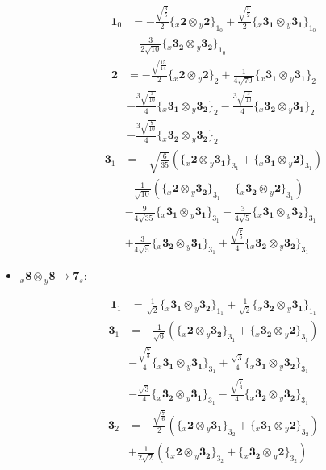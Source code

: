 \documentclass[english]{article}
\newcommand{\rep}[1]{\mathbf{#1}}
\newcommand{\repx}[2]{{}_{#2}\mathbf{#1}}
\newcommand{\tsprodx}[2]{\repx{#1}{x}\otimes\repx{#2}{y}}
\newcommand{\subcgs}[3]{\big\{ \tsprodx{#1}{#2}\big\}^{}_{#3}}
\begin{document}
\begin{itemize}
\begin{fleqn}
\begin{align*}
\rep{1}_{0} & = -\frac{\sqrt{\frac{3}{5}}}{2}\subcgs{2}{2}{1_{0}}+\frac{\sqrt{\frac{5}{2}}}{2}\subcgs{3_{1}}{3_{1}}{1_{0}} \\ 
 & -\frac{3}{2 \sqrt{10}}\subcgs{3_{2}}{3_{2}}{1_{0}}
\end{align*}
\begin{align*}
\rep{2} & = -\frac{\sqrt{\frac{15}{14}}}{2}\subcgs{2}{2}{2}+\frac{1}{4 \sqrt{70}}\subcgs{3_{1}}{3_{1}}{2} \\ 
 & -\frac{3 \sqrt{\frac{3}{10}}}{4}\subcgs{3_{1}}{3_{2}}{2}-\frac{3 \sqrt{\frac{3}{10}}}{4}\subcgs{3_{2}}{3_{1}}{2} \\ 
 & -\frac{3 \sqrt{\frac{7}{10}}}{4}\subcgs{3_{2}}{3_{2}}{2}
\end{align*}
\begin{align*}
\rep{3}_{1} & = -\sqrt{\frac{6}{35}}\left(\subcgs{2}{3_{1}}{3_{1}}+\subcgs{3_{1}}{2}{3_{1}}\right) \\ 
 & -\frac{1}{\sqrt{10}}\left(\subcgs{2}{3_{2}}{3_{1}}+\subcgs{3_{2}}{2}{3_{1}}\right) \\ 
 & -\frac{9}{4 \sqrt{35}}\subcgs{3_{1}}{3_{1}}{3_{1}}-\frac{3}{4 \sqrt{5}}\subcgs{3_{1}}{3_{2}}{3_{1}} \\ 
 & +\frac{3}{4 \sqrt{5}}\subcgs{3_{2}}{3_{1}}{3_{1}}+\frac{\sqrt{\frac{7}{5}}}{4}\subcgs{3_{2}}{3_{2}}{3_{1}}
\end{align*}
\end{fleqn}
\item $\tsprodx{8}{8}\to\rep{7}_{s}$:
\begin{fleqn}
\begin{align*}
\rep{1}_{1} & = \frac{1}{\sqrt{2}}\subcgs{3_{1}}{3_{2}}{1_{1}}+\frac{1}{\sqrt{2}}\subcgs{3_{2}}{3_{1}}{1_{1}}
\end{align*}
\begin{align*}
\rep{3}_{1} & = -\frac{1}{\sqrt{6}}\left(\subcgs{2}{3_{2}}{3_{1}}+\subcgs{3_{2}}{2}{3_{1}}\right) \\ 
 & -\frac{\sqrt{\frac{7}{3}}}{4}\subcgs{3_{1}}{3_{1}}{3_{1}}+\frac{\sqrt{3}}{4}\subcgs{3_{1}}{3_{2}}{3_{1}} \\ 
 & -\frac{\sqrt{3}}{4}\subcgs{3_{2}}{3_{1}}{3_{1}}-\frac{\sqrt{\frac{7}{3}}}{4}\subcgs{3_{2}}{3_{2}}{3_{1}}
\end{align*}
\begin{align*}
\rep{3}_{2} & = -\frac{\sqrt{\frac{7}{6}}}{2}\left(\subcgs{2}{3_{1}}{3_{2}}+\subcgs{3_{1}}{2}{3_{2}}\right) \\ 
 & +\frac{1}{2 \sqrt{2}}\left(\subcgs{2}{3_{2}}{3_{2}}+\subcgs{3_{2}}{2}{3_{2}}\right) \\ 

\end{align*}
\end{fleqn}
\end{itemize}
\end{document}
